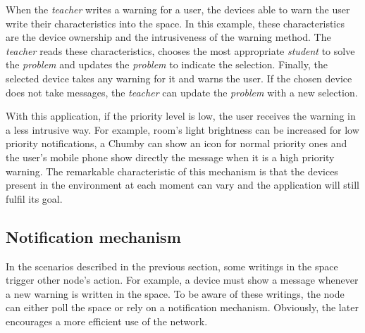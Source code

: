When the \emph{teacher} writes a warning for a user, the devices able to warn the user write their characteristics into the space. %
In this example, these characteristics are the device ownership and the intrusiveness of the warning method.
The \emph{teacher} reads these characteristics, chooses the most appropriate \emph{student} to solve the \emph{problem} and updates the \emph{problem} to indicate the selection.
Finally, the selected device takes any warning for it and warns the user. %
If the chosen device does not take messages, the \emph{teacher} can update the \emph{problem} with a new selection.


With this application, if the priority level is low, the user receives the warning in a less intrusive way.
For example, room's light brightness can be increased for low priority notifications, a Chumby  can show an icon for normal priority ones and the user's mobile phone show directly the message when it is a high priority warning. %
The remarkable characteristic of this mechanism is that the devices present in the environment at each moment can vary and the application will still fulfil its goal.




\subsection{Notification mechanism}
\label{sec:notification}


In the scenarios described in the previous section, some writings in the space trigger other node's action.
For example, a device must show a message whenever a new warning is written in the space. %
To be aware of these writings, the node can either poll the space or rely on a notification mechanism. %
Obviously, the later encourages a more efficient use of the network. %

